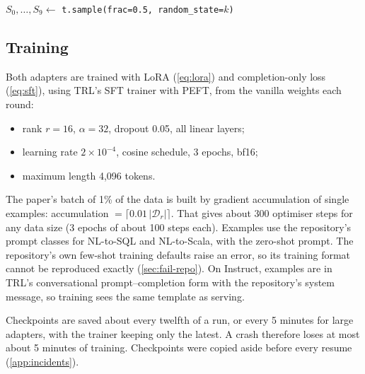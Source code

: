 \begin{algorithm}[htbp]
\caption{Our validation of one pair ()}\label{alg:ours-validate}
$S_0,\dots,S_9 \leftarrow$ \texttt{t.sample(frac=0.5, random\_state=}$k$\texttt{)}\;
\end{algorithm}

\subsection{Training}

Both adapters are trained with LoRA (\cref{eq:lora}) and completion-only loss (\cref{eq:sft}), using TRL's SFT trainer
with PEFT, from the vanilla weights each round:
\begin{itemize}
\item rank $r=16$, $\alpha=32$, dropout 0.05, all linear layers;
\item learning rate $2\times10^{-4}$, cosine schedule, 3 epochs, bf16;
\item maximum length 4,096 tokens.
\end{itemize}
The paper's batch of 1\% of the data is built by gradient accumulation of single examples: accumulation $=\lceil
0.01\,|\mathcal{D}_r|\rceil$. That gives about 300 optimiser steps for any data size (3 epochs of about 100 steps each).
Examples use the repository's prompt classes for NL-to-SQL and NL-to-Scala, with the zero-shot prompt. The repository's
own few-shot training defaults raise an error, so its training format cannot be reproduced exactly
(\cref{sec:fail-repo}). On Instruct, examples are in TRL's conversational prompt--completion form with the repository's
system message, so training sees the same template as serving.

Checkpoints are saved about every twelfth of a run, or every 5 minutes for large adapters, with the trainer keeping
only the latest. A crash therefore loses at most about 5 minutes of training. Checkpoints were copied aside before
every resume (\cref{app:incidents}).


